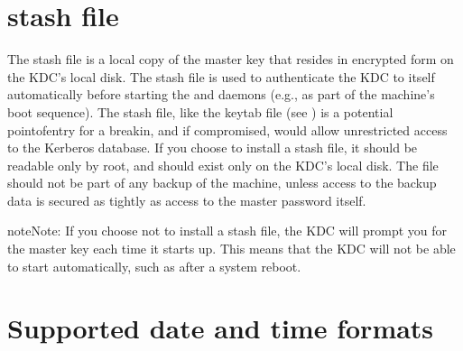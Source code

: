 \documentclass[letterpaper,10pt,english]{sphinxmanual}
\begin{document}
\chapter{stash file}
\label{\detokenize{basic/stash_file_def:stash-file}}\label{\detokenize{basic/stash_file_def:stash-definition}}\label{\detokenize{basic/stash_file_def::doc}}
\sphinxAtStartPar
The stash file is a local copy of the master key that resides in
encrypted form on the KDC’s local disk.  The stash file is used to
authenticate the KDC to itself automatically before starting the
 and  daemons (e.g., as part of the
machine’s boot sequence).  The stash file, like the keytab file (see
) is a potential point\sphinxhyphen{}of\sphinxhyphen{}entry for a break\sphinxhyphen{}in, and
if compromised, would allow unrestricted access to the Kerberos
database.  If you choose to install a stash file, it should be
readable only by root, and should exist only on the KDC’s local disk.
The file should not be part of any backup of the machine, unless
access to the backup data is secured as tightly as access to the
master password itself.

\begin{sphinxadmonition}{note}{Note:}
\sphinxAtStartPar
If you choose not to install a stash file, the KDC will prompt you for the master key each time it starts up.
This means that the KDC will not be able to start automatically, such as after a system reboot.
\end{sphinxadmonition}


\chapter{Supported date and time formats}
\label{\detokenize{basic/date_format:supported-date-and-time-formats}}\label{\detokenize{basic/date_format:datetime}}\label{\detokenize{basic/date_format::doc}}
\end{document}
